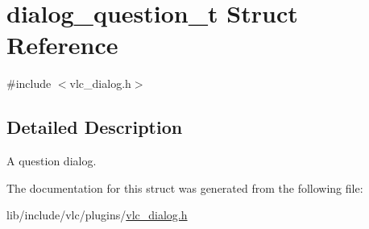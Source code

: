 \hypertarget{structdialog__question__t}{}\section{dialog\+\_\+question\+\_\+t Struct Reference}
\label{structdialog__question__t}


{\ttfamily \#include $<$vlc\+\_\+dialog.\+h$>$}



\subsection{Detailed Description}
A question dialog. 

The documentation for this struct was generated from the following file\+:\begin{DoxyCompactItemize}
\item 
lib/include/vlc/plugins/\hyperlink{vlc__dialog_8h}{vlc\+\_\+dialog.\+h}\end{DoxyCompactItemize}

